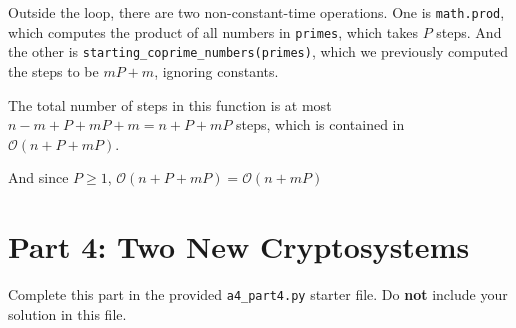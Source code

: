\documentclass[fontsize=11pt]{article}
\newcommand{\cO}{\mathcal{O}}
\newcommand{\code}[1]{\texttt{#1}}
\begin{document}
\begin{enumerate}
Outside the loop, there are two non-constant-time operations. One is \code{math.prod}, which computes the product of all numbers in \code{primes}, which takes $P$ steps. And the other is \code{starting\_coprime\_numbers(primes)}, which we previously computed the steps to be $mP + m$, ignoring constants.

The total number of steps in this function is at most $n - m + P + mP + m = n + P + mP$ steps, which is contained in $\cO(n + P + mP)$.

And since $P \ge 1$, $\cO(n + P + mP) = \cO(n + mP)$

\end{enumerate}

\section*{Part 4: Two New Cryptosystems}

Complete this part in the provided \texttt{a4\_part4.py} starter file.
Do \textbf{not} include your solution in this file.
\end{document}
